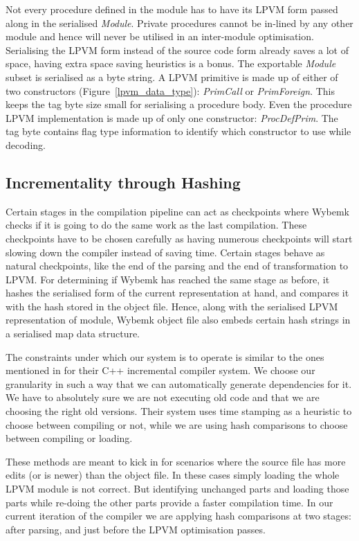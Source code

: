 Not every procedure defined in the module has to have its LPVM form passed
along in the serialised \textit{Module}. Private procedures cannot be in-lined
by any other module and hence will never be utilised in an inter-module
optimisation. Serialising the LPVM form instead of the source code form already
saves a lot of space, having extra space saving heuristics is a bonus. The
exportable \textit{Module} subset is serialised as a byte string. A LPVM
primitive is made up of either of two constructors
(Figure~\ref{lpvm_data_type}): \textit{PrimCall} or \textit{PrimForeign}. This
keeps the tag byte size small for serialising a procedure body. Even the
procedure LPVM implementation is made up of only one constructor:
\textit{ProcDefPrim}. The tag byte contains flag type information to identify
which constructor to use while decoding.



\subsection{Incrementality through Hashing}

Certain stages in the compilation pipeline can act as checkpoints where Wybemk
checks if it is going to do the same work as the last compilation. These
checkpoints have to be chosen carefully as having numerous checkpoints will
start slowing down the compiler instead of saving time. Certain stages behave
as natural checkpoints, like the end of the parsing and the end of
transformation to LPVM. For determining if Wybemk has reached the same stage as
before, it hashes the serialised form of the current representation at hand,
and compares it with the hash stored in the object file. Hence, along with the
serialised LPVM representation of module, Wybemk object file also embeds
certain hash strings in a serialised map data structure.

The constraints under which our system is to operate is similar to the ones
mentioned in \cite{cpp_compiler} for their C++ incremental compiler system. We
choose our granularity in such a way that we can automatically generate
dependencies for it. We have to absolutely sure we are not executing old code
and that we are choosing the right old versions. Their system uses time
stamping as a heuristic to choose between compiling or not, while we are using
hash comparisons to choose between compiling or loading.

These methods are meant to kick in for scenarios where the source file has more
edits (or is newer) than the object file. In these cases simply loading the
whole LPVM module is not correct. But identifying unchanged parts and loading
those parts while re-doing the other parts provide a faster compilation
time. In our current iteration of the compiler we are applying hash comparisons
at two stages: after parsing, and just before the LPVM optimisation passes.

